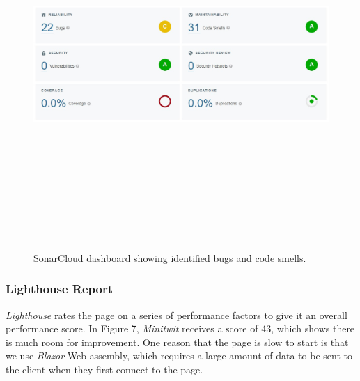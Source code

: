 \begin{figure}[H]
    \centering
    \includegraphics[width=16cm,height=14cm,keepaspectratio]{images/sonarcloud.jpg}
    \caption{SonarCloud dashboard showing identified bugs and code smells.}
    \label{ComponentDiagram_1}
\end{figure}

\subsubsection{Lighthouse Report}
\textit{Lighthouse} rates the page on a series of performance factors to give it an overall performance score. In Figure 7, \textit{Minitwit} receives a score of 43, which shows there is much room for improvement. One reason that the page is slow to start is that we use \textit{Blazor} Web assembly, which requires a large amount of data to be sent to the client when they first connect to the page.

